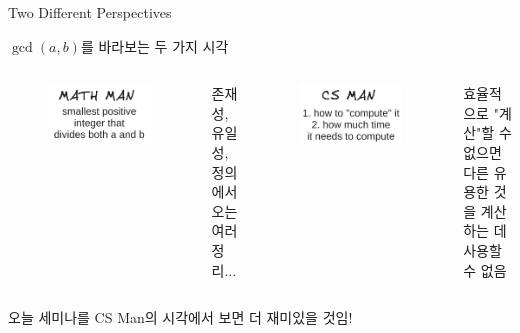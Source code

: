 \documentclass[../240513_msquare_shor.tex]{subfiles}
\begin{document}
\begin{frame}{Two Different Perspectives}
    \begin{exampleblock}{}
        \begin{center}
            \(\gcd(a,b)\)를 바라보는 두 가지 시각
        \end{center}
    \end{exampleblock}
    \pause
    \begin{columns}
        \begin{figure}
            \centering
            \includegraphics[width=\textwidth]{images/gcd_math.png}
        \end{figure}
        \centering
        존재성, 유일성, 정의에서 오는 여러 정리...
        \pause
        \begin{figure}
            \centering
            \includegraphics[width=\textwidth]{images/gcd_cs.png}
        \end{figure}
        \centering
        효율적으로 "계산"할 수 없으면 다른 유용한 것을 계산하는 데 사용할 수 없음
    \end{columns}
    \pause
    \vfill
    \centering
    오늘 세미나를 CS Man의 시각에서 보면 더 재미있을 것임!
\end{frame}
\end{document}
